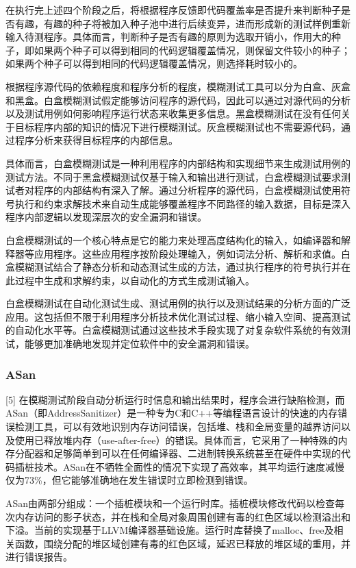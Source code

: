 在执行完上述四个阶段之后，将根据程序反馈即代码覆盖率是否提升来判断种子是否有趣，有趣的种子将被加入种子池中进行后续变异，进而形成新的测试样例重新输入待测程序。具体而言，判断种子是否有趣的原则为选取开销小，作用大的种子，即如果两个种子可以得到相同的代码逻辑覆盖情况，则保留文件较小的种子；如果两个种子可以得到相同的代码逻辑覆盖情况，则选择耗时较小的。

根据程序源代码的依赖程度和程序分析的程度，模糊测试工具可以分为白盒、灰盒和黑盒。白盒模糊测试假定能够访问程序的源代码，因此可以通过对源代码的分析以及测试用例如何影响程序运行状态来收集更多信息。黑盒模糊测试在没有任何关于目标程序内部的知识的情况下进行模糊测试。灰盒模糊测试也不需要源代码，通过程序分析来获得目标程序的内部信息。

具体而言，白盒模糊测试是一种利用程序的内部结构和实现细节来生成测试用例的测试方法。不同于黑盒模糊测试仅基于输入和输出进行测试，白盒模糊测试要求测试者对程序的内部结构有深入了解。通过分析程序的源代码，白盒模糊测试使用符号执行和约束求解技术来自动生成能够覆盖程序不同路径的输入数据，目标是深入程序内部逻辑以发现深层次的安全漏洞和错误。

白盒模糊测试的一个核心特点是它的能力来处理高度结构化的输入，如编译器和解释器等应用程序。这些应用程序按阶段处理输入，例如词法分析、解析和求值。白盒模糊测试结合了静态分析和动态测试生成的方法，通过执行程序的符号执行并在此过程中生成和求解约束，以自动化的方式生成测试输入。

白盒模糊测试在自动化测试生成、测试用例的执行以及测试结果的分析方面的广泛应用。这包括但不限于利用程序分析技术优化测试过程、缩小输入空间、提高测试的自动化水平等。白盒模糊测试通过这些技术手段实现了对复杂软件系统的有效测试，能够更加准确地发现并定位软件中的安全漏洞和错误。

\subsubsection{ASan}

[5]
在模糊测试阶段自动分析运行时信息和输出结果时，程序会进行缺陷检测，而ASan（即AddressSanitizer）是一种专为C和C++等编程语言设计的快速的内存错误检测工具，可以有效地识别内存访问错误，包括堆、栈和全局变量的越界访问以及使用已释放堆内存（use-after-free）的错误。具体而言，它采用了一种特殊的内存分配器和足够简单到可以在任何编译器、二进制转换系统甚至在硬件中实现的代码插桩技术。ASan在不牺牲全面性的情况下实现了高效率，其平均运行速度减慢仅为73\%，但它能够准确地在发生错误时立即检测到错误。

ASan由两部分组成：一个插桩模块和一个运行时库。插桩模块修改代码以检查每次内存访问的影子状态，并在栈和全局对象周围创建有毒的红色区域以检测溢出和下溢。当前的实现基于LLVM编译器基础设施。运行时库替换了malloc、free及相关函数，围绕分配的堆区域创建有毒的红色区域，延迟已释放的堆区域的重用，并进行错误报告。

